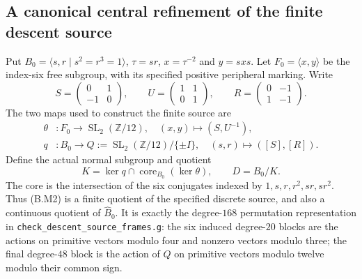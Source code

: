 \subsection{A canonical central refinement of the finite descent source}

Put $B_0=\langle s,r\mid s^2=r^3=1\rangle$, $\tau=sr$,
$x=\tau^{-2}$ and $y=sxs$.  Let $F_0=\langle x,y\rangle$ be
the index-six free subgroup, with its specified positive peripheral
marking.  Write
\[
 S=\begin{pmatrix}0&1\\-1&0\end{pmatrix},\qquad
 U=\begin{pmatrix}1&1\\0&1\end{pmatrix},\qquad
 R=\begin{pmatrix}0&-1\\1&-1\end{pmatrix}.
\]
The two maps used to construct the finite source are
\[
\begin{aligned}
 \theta&:F_0\longrightarrow\operatorname{SL}_2(\mathbb Z/12),
 \quad (x,y)\longmapsto(S,U^{-1}),\\
 q&:B_0\longrightarrow
 Q:=\operatorname{SL}_2(\mathbb Z/12)/\{\pm I\},
 \quad(s,r)\longmapsto([S],[R]).
\end{aligned}                                  \tag{B.M1}
\]
Define the actual normal subgroup and quotient
\[
 K=\ker q\cap\operatorname{core}_{B_0}(\ker\theta),
 \qquad D=B_0/K.                               \tag{B.M2}
\]
The core is the intersection of the six conjugates indexed by
$1,s,r,r^2,sr,sr^2$.  Thus (B.M2) is a finite quotient of the
specified discrete source, and also a continuous quotient of
$\widehat B_0$.  It is exactly the degree-$168$ permutation
representation in \texttt{check\_descent\_source\_frames.g}:
the six induced degree-$20$ blocks are the actions on primitive
vectors modulo four and nonzero vectors modulo three; the final
degree-$48$ block is the action of $Q$ on primitive vectors modulo
twelve modulo their common sign.


